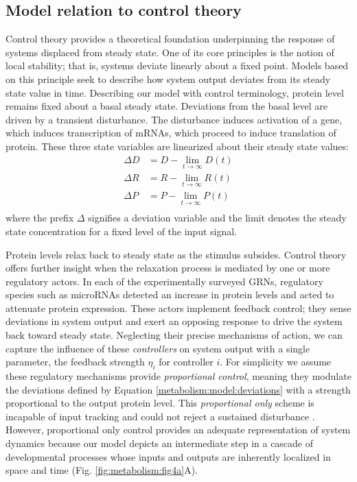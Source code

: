 \subsection{Model relation to control theory}

Control theory provides a theoretical foundation underpinning the response of systems displaced from steady state. One of its core principles is the notion of local stability; that is, systems deviate linearly about a fixed point. Models based on this principle seek to describe how system output deviates from its steady state value in time. Describing our model with control terminology, protein level remains fixed about a basal steady state. Deviations from the basal level are driven by a transient disturbance. The disturbance induces activation of a gene, which induces transcription of mRNAs, which proceed to induce translation of protein. These three state variables are linearized about their steady state values:
\begin{equation}
\label{metabolism:model:deviations}
\begin{aligned}
\Delta D &= D - \lim_{t \to \infty} D(t) \\
\Delta R &= R - \lim_{t \to \infty} R(t) \\
\Delta P &= P - \lim_{t \to \infty} P(t) \\
\end{aligned}
\end{equation}
where the prefix $\Delta$ signifies a deviation variable and the limit denotes the steady state concentration for a fixed level of the input signal.

Protein levels relax back to steady state as the stimulus subsides. Control theory offers further insight when the relaxation process is mediated by one or more regulatory actors. In each of the experimentally surveyed GRNs, regulatory species such as microRNAs detected an increase in protein levels and acted to attenuate protein expression. These actors implement feedback control; they sense deviations in system output and exert an opposing response to drive the system back toward steady state. Neglecting their precise mechanisms of action, we can capture the influence of these \emph{controllers} on system output with a single parameter, the feedback strength $\eta_i$ for controller $i$. For simplicity we assume these regulatory mechanisms provide \emph{proportional control}, meaning they modulate the deviations defined by Equation \ref{metabolism:model:deviations} with a strength proportional to the output protein level. This \emph{proportional only} scheme is incapable of input tracking and could not reject a sustained disturbance \cite{Yi2000}. However, proportional only control provides an adequate representation of system dynamics because our model depicts an intermediate step in a cascade of developmental processes whose inputs and outputs are inherently localized in space and time (Fig. \ref{fig:metabolism:fig4a}A).

